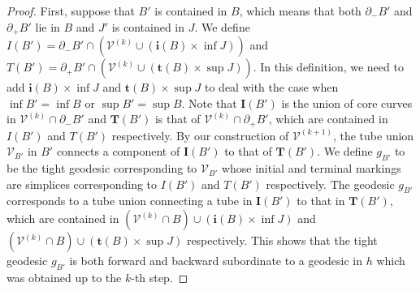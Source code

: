 \documentclass{amsart}
\theoremstyle{definition}
\numberwithin{figure}{section}
\numberwithin{equation}{section}
\def\cv{\mathcal{V}}
\begin{document}
\begin{proof}
First, suppose that $B'$ is contained in $B$, which means that both $\partial_-B'$ and $\partial_+ B'$ lie in $B$ and $J'$ is contained in $J$.
We define $I(B')= \partial_- B' \cap (\cv^{(k)} \cup (\boldsymbol{i}(B) \times \inf J))$ and $T(B')= \partial_+ B' \cap (\cv^{(k)} \cup (\boldsymbol{t}(B) \times \sup J))$.
In this definition, we need to add $\boldsymbol{i}(B) \times \inf J$ and $\boldsymbol{t}(B) \times \sup J$ to deal with the case when $\inf B'=\inf B$ or $\sup B'= \sup B$.
Note that $\boldsymbol{I}(B')$ is the union of core curves in $\cv^{(k)} \cap \partial_-B'$ and $\boldsymbol{T}(B')$ is that of $\cv^{(k)}\cap \partial_+B'$, which are contained in $I(B')$ and $T(B')$ respectively.
By our construction of $\cv^{(k+1)}$, the tube union $\cv_{B'}$ in $B'$ connects a component of $\boldsymbol{I}(B')$ to that of $\boldsymbol{T}(B')$.
We define $g_{B'}$ to be the tight geodesic corresponding to $\cv_{B'}$ whose initial and terminal markings are simplices corresponding to $I(B')$ and $T(B')$ respectively.
The geodesic $g_{B'}$ corresponds to a tube union connecting a tube in $\boldsymbol{I}(B')$ to that  in $\boldsymbol{T}(B')$, which are contained in $(\cv^{(k)} \cap B) \cup (\boldsymbol{i}(B) \times \inf J)$ and $(\cv^{(k)} \cap B) \cup (\boldsymbol{t}(B) \times \sup J)$ respectively.
This shows that the tight geodesic $g_{B'}$  is both forward and backward subordinate to a geodesic in $h$ which was obtained up to the $k$-th step.


\end{proof}
\end{document}
